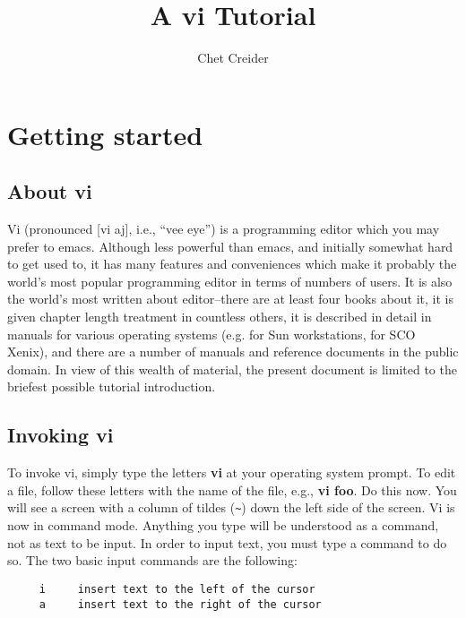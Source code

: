 \setlength{\parindent}{0pt}
\setlength{\parskip}{5pt}

\title{A vi Tutorial}
\author{Chet Creider}



\maketitle

\section{Getting started} 

\subsection{About vi}

Vi (pronounced [vi aj], i.e., ``vee eye'') is a programming editor 
which you may prefer to emacs. Although less powerful than emacs, 
and initially somewhat hard to get used to, it has many features 
and conveniences which make it probably the world's most popular 
programming editor in terms of numbers of users. It is also the 
world's most written about editor--there are at least four 
books about it, it is given chapter length treatment in 
countless others, it is described in detail in manuals for 
various operating systems (e.g. for Sun workstations, for SCO 
Xenix), and there are a number of manuals and reference documents 
in the public domain. In view of this wealth of material, the 
present document is limited to the briefest possible tutorial 
introduction. 

\subsection{Invoking vi}

To invoke vi, simply type the letters {\bf vi} at your operating 
system prompt. To edit a file, follow these letters with the 
name of the file, e.g., {\bf vi foo}. Do this now. You will see a 
screen with a column of tildes (\verb+~+) down the left side of the 
screen. Vi is now in command mode. Anything you type will be 
understood as a command, not as text to be input. In order to 
input text, you must type a command to do so. The two basic input 
commands are the following:

\begin{verbatim}
     i     insert text to the left of the cursor
     a     insert text to the right of the cursor
\end{verbatim}

